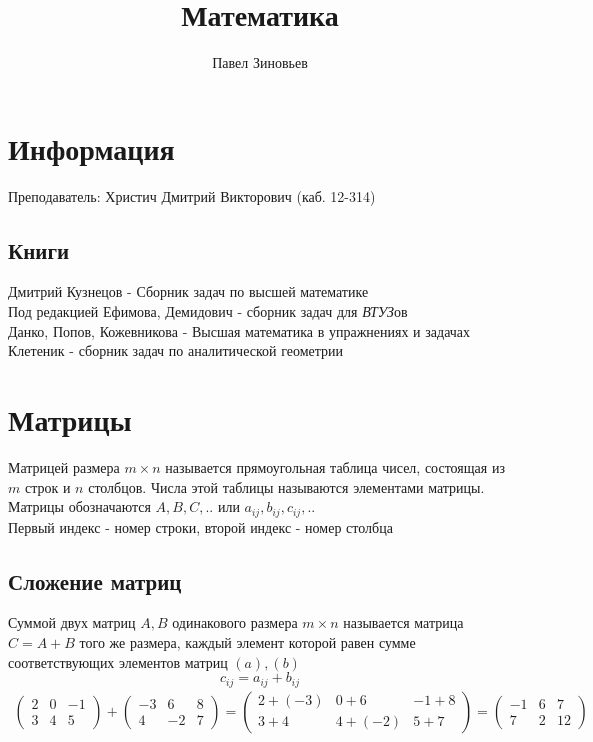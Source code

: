 \documentclass[a4paper, 11pt, oneside]{article}
\title{Математика}
\author{Павел Зиновьев}
\begin{document}
\maketitle
\newpage
\tableofcontents
\contentsname
\newpage


\section{Информация}
Преподаватель: Христич Дмитрий Викторович (каб. 12-314)
\subsection{Книги}

Дмитрий Кузнецов - Сборник задач по высшей математике\\
Под редакцией Ефимова, Демидович - сборник задач для {\itshape ВТУЗ}ов\\
Данко, Попов, Кожевникова - Высшая математика в упражнениях и задачах\\
Клетеник - сборник задач по аналитической геометрии

\section{Матрицы}
Матрицей размера $m\times n$ называется прямоугольная таблица чисел, состоящая из $m$ строк и $n$ столбцов. Числа этой таблицы называются элементами матрицы. Матрицы обозначаются $A, B, C,..$ или $a_{ij}, b_{ij}, c_{ij},..$\\
Первый индекс - номер строки, второй индекс - номер столбца

\subsection{Сложение матриц}

Суммой двух матриц $A, B$ одинакового размера $m\times n$ называется матрица $C = A+B$ того же размера, каждый элемент которой равен сумме соответствующих элементов матриц $(a), (b)$
$$
	c_{ij} = a_{ij} + b_{ij}
$$
\begin{gather*}
	\begin{pmatrix}
		2& 0& -1\\
		3& 4& 5
	\end{pmatrix}
	+
	\begin{pmatrix}
		-3& 6& 8\\
		4& -2& 7
	\end{pmatrix}
	=
	\begin{pmatrix}
		2+(-3)& 0+6& -1+8\\
		3+4& 4+(-2)& 5+7
	\end{pmatrix}
	=
	\begin{pmatrix}
		-1& 6& 7\\
		7& 2& 12
	\end{pmatrix}
\end{gather*}
\end{document}
